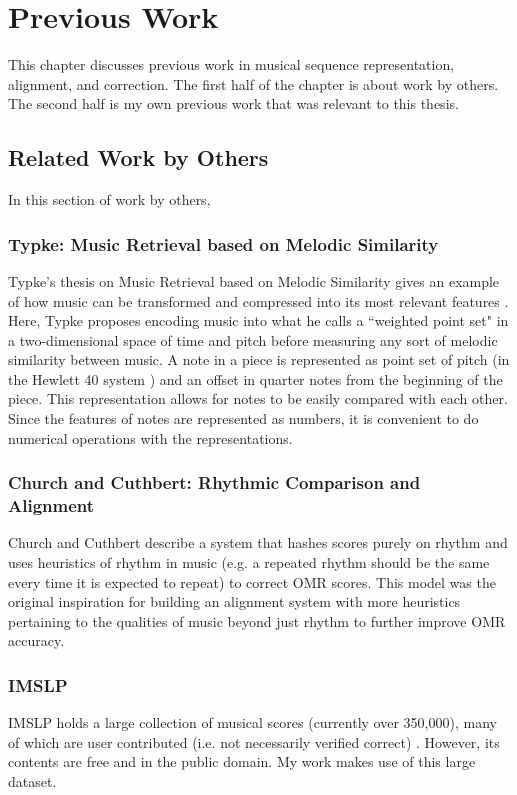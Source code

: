 \chapter{Previous Work}
This chapter discusses previous work in musical sequence representation, alignment, and correction. The first half of the chapter is about work by others. The second half is my own previous work that was relevant to this thesis. 

\section{Related Work by Others}
In this section of work by others, 
\subsection{Typke: Music Retrieval based on Melodic Similarity}
Typke's thesis on Music Retrieval based on Melodic Similarity gives an example of how music can be transformed and compressed into its most relevant features \cite{typke}. Here, Typke proposes encoding music into what he calls a ``weighted point set" in a two-dimensional space of time and pitch before measuring any sort of melodic similarity between music. A note in a piece is represented as point set of pitch (in the Hewlett 40 system \cite{hewlett}) and an offset in quarter notes from the beginning of the piece. This representation allows for notes to be easily compared with each other. Since the features of notes are represented as numbers, it is convenient to do numerical operations with the representations. 

\subsection{Church and Cuthbert: Rhythmic Comparison and Alignment}
Church and Cuthbert \cite{church} describe a system that hashes scores purely on rhythm and uses heuristics of rhythm in music (e.g. a repeated rhythm should be the same every time it is expected to repeat) to correct OMR scores. This model was the original inspiration for building an alignment system with more heuristics pertaining to the qualities of music beyond just rhythm to further improve OMR accuracy.

\subsection{IMSLP}
IMSLP holds a large collection of musical scores (currently over 350,000), many of which are user contributed (i.e. not necessarily verified correct) \cite{imslp}. However, its contents are free and in the public domain. My work makes use of this large dataset. 

